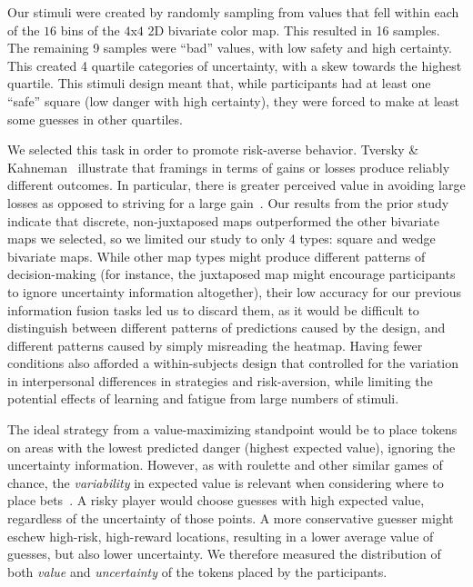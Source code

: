 Our stimuli were created by randomly sampling from values that fell within each of the $16$ bins of the $4$x$4$ 2D bivariate color map. This resulted in 16 samples. The remaining 9 samples were ``bad'' values, with low safety and high certainty. This created 4 quartile categories of uncertainty, with a skew towards the highest quartile. This stimuli design meant that, while participants had at least one ``safe'' square (low danger with high certainty), they were forced to make at least some guesses in other quartiles.

We selected this task in order to promote risk-averse behavior. Tversky \& Kahneman~\cite{tversky1985framing} illustrate that framings in terms of gains or losses produce reliably different outcomes. In particular, there is greater perceived value in avoiding large losses as opposed to striving for a large gain~\cite{kahneman1979prospect}. Our results from the prior study indicate that discrete, non-juxtaposed maps outperformed the other bivariate maps we selected, so we limited our study to only 4 types: square and wedge bivariate maps. While other map types might produce different patterns of decision-making (for instance, the juxtaposed map might encourage participants to ignore uncertainty information altogether), their low accuracy for our previous information fusion tasks led us to discard them, as it would be difficult to distinguish between different patterns of predictions caused by the design, and different patterns caused by simply misreading the heatmap. Having fewer conditions also afforded a within-subjects design that controlled for the variation in interpersonal differences in strategies and risk-aversion, while limiting the potential effects of learning and fatigue from large numbers of stimuli.

The ideal strategy from a value-maximizing standpoint would be to place tokens on areas with the lowest predicted danger (highest expected value), ignoring the uncertainty information. However, as with roulette and other similar games of chance, the \emph{variability} in expected value is relevant when considering where to place bets~\cite{mlodinow2009drunkard}. A risky player would choose guesses with high expected value, regardless of the uncertainty of those points. A more conservative guesser might eschew high-risk, high-reward locations, resulting in a lower average value of guesses, but also lower uncertainty. We therefore measured the distribution of both \emph{value} and \emph{uncertainty} of the tokens placed by the participants.

